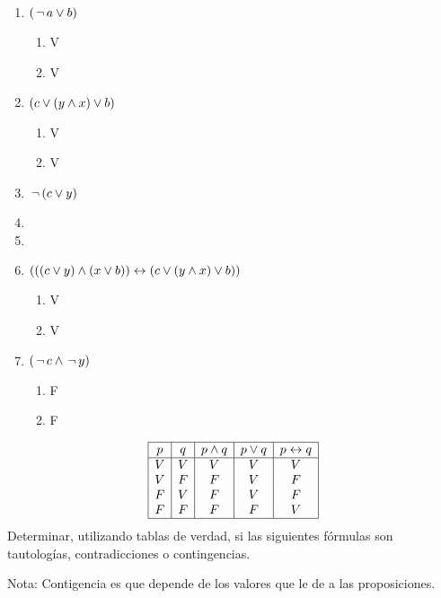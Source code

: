 \documentclass[12pt,a4paper,spanish]{article}
\begin{document}
\begin{multicols}{2}
	\begin{enumerate}[label=\alph*)]
		\item $(\,\lnot\, a \lor b) $
		      \begin{enumerate}[label=\arabic*. ]
			      \item V
			      \item V
		      \end{enumerate}
		\item $(c \lor (y \land x) \lor b)$
		      \begin{enumerate}[label=\arabic*. ]
			      \item V
			      \item V
		      \end{enumerate}
		\item $\,\lnot\, (c \lor y)$ \hacer
		\item \hacer
		\item \hacer
		\item $(((c \lor y) \land (x \lor b)) \leftrightarrow (c \lor (y \land x) \lor b))$
		      \begin{enumerate}[label=\arabic*. ]
			      \item V
			      \item V
		      \end{enumerate}
		\item $(\,\lnot\, c \land \,\lnot\, y) $
		      \begin{enumerate}[label=\arabic*. ]
			      \item F
			      \item F
		      \end{enumerate}
	\end{enumerate}

\end{multicols}
\[
	\begin{array}{|c|c|c|c|c|c|c|c|}
		\hline
		p & q & p \land q & p \lor q & p \leftrightarrow q \\ \hline
		V & V & V      & V      & V             \\
		V & F & F      & V      & F             \\
		F & V & F      & V      & F             \\
		F & F & F      & F      & V             \\
		\hline
	\end{array}
\]
\ejercicio Determinar, utilizando tablas de verdad,
si las siguientes fórmulas son tautologías,
contradicciones o contingencias.

Nota: Contigencia es que depende de los valores que le de a las proposiciones.
\end{document}
